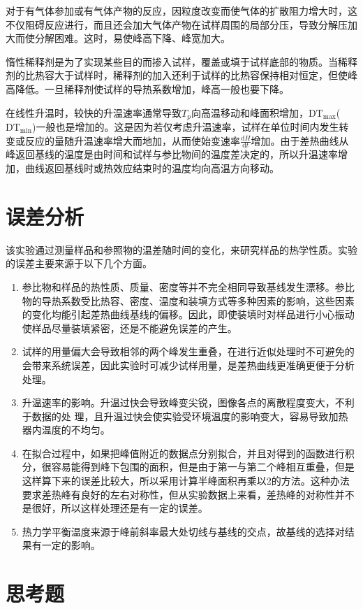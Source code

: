 \documentclass[a4paper]{article}
\begin{document}
对于有气体参加或有气体产物的反应，因粒度改变而使气体的扩散阻力增大时，这不仅阻碍反应进行，而且还会加大气体产物在试样周围的局部分压，导致分解压加大而使分解困难。这时，易使峰高下降、峰宽加大。

惰性稀释剂是为了实现某些目的而掺入试样，覆盖或填于试样底部的物质。当稀释剂的比热容大于试样时，稀释剂的加入还利于试样的比热容保持相对恒定，但使峰高降低。一旦稀释剂使试样的导热系数增加，峰高一般也要下降。

在线性升温时，较快的升温速率通常导致$T_p$向高温移动和峰面积增加，$\text{DT}_{\text{max}}$($\text{DT}_{\text{min}}$)一般也是增加的。这是因为若仅考虑升温速率，试样在单位时间内发生转变或反应的量随升温速率增大而地加，从而使始变速率$\frac{\text{d}H}{\text{d}t}$增加。由于差热曲线从峰返回基线的温度是由时间和试样与参比物间的温度差决定的，所以升温速率增加，曲线返回基线时或热效应结束时的温度均向高温方向移动。


\section{误差分析}
该实验通过测量样品和参照物的温差随时间的变化，来研究样品的热学性质。实验的误差主要来源于以下几个方面。
\begin{enumerate}
\item 参比物和样品的热性质、质量、密度等并不完全相同导致基线发生漂移。参比物的导热系数受比热容、密度、温度和装填方式等多种因素的影响，这些因素的变化均能引起差热曲线基线的偏移。因此，即使装填时对样品进行小心振动使样品尽量装填紧密，还是不能避免误差的产生。
\item 试样的用量偏大会导致相邻的两个峰发生重叠，在进行近似处理时不可避免的会带来系统误差，因此实验时可减少试样用量，是差热曲线更准确更便于分析处理。
\item 升温速率的影响。升温过快会导致峰变尖锐，图像各点的离散程度变大，不利于数据的处
理，且升温过快会使实验受环境温度的影响变大，容易导致加热器内温度的不均匀。
\item 在拟合过程中，如果把峰值附近的数据点分别拟合，并且对得到的函数进行积分，很容易能得到峰下包围的面积，但是由于第一与第二个峰相互重叠，但是这样算下来的误差比较大，所以采用计算半峰面积再乘以2的方法。这种办法要求差热峰有良好的左右对称性，但从实验数据上来看，差热峰的对称性并不是很好，所以这样处理还是有一定的误差。
\item 热力学平衡温度来源于峰前斜率最大处切线与基线的交点，故基线的选择对结果有一定的影响。
\end{enumerate}

\section{思考题}
\end{document}

